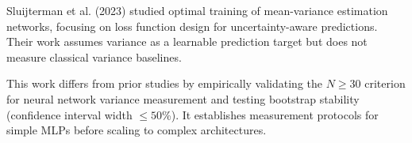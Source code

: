 Sluijterman et al. (2023) studied optimal training of mean-variance estimation networks, focusing on loss function design for uncertainty-aware predictions. Their work assumes variance as a learnable prediction target but does not measure classical variance baselines.

This work differs from prior studies by empirically validating the $N\geq 30$ criterion for neural network variance measurement and testing bootstrap stability (confidence interval width $\leq 50$\%). It establishes measurement protocols for simple MLPs before scaling to complex architectures.
